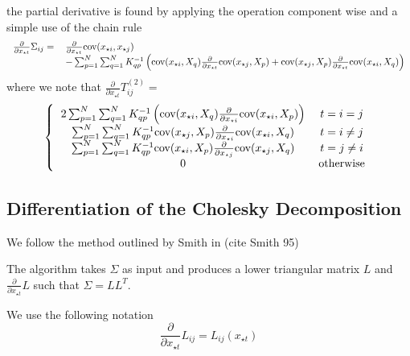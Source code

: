 \documentclass[phd,tocprelim]{cornell}
\begin{document}
the partial derivative is found by applying the operation component wise and a simple use of the chain rule
\begin{equation}
 \begin{tabular}{rl}
 $\frac{\partial}{\partial x_{\star t}} \Sigma_{ij} =$ & $\frac{\partial}{\partial x_{\star t}} \mbox{cov}(x_{\star i}, x_{\star j})$ \\
 & $- \sum_{p = 1}^{N} \sum_{q = 1}^{N} K^{-1}_{qp} \left( \mbox{cov}(x_{\star i}, X_{q}) \frac{\partial}{\partial x_{\star t}} \mbox{cov}(x_{\star j}, X_{p}) + \mbox{cov}(x_{\star j}, X_{p}) \frac{\partial}{\partial x_{\star t}} \mbox{cov}(x_{\star i}, X_{q}) \right)$
 \end{tabular}
\end{equation}
where we note that $\frac{\partial}{\partial x_{\star t}} T^{(2)}_{ij} = $
\begin{equation}
    \left\{ \begin{tabular}{cc}
        $2 \sum_{p = 1}^{N} \sum_{q = 1}^{N} K^{-1}_{qp} \left( \mbox{cov}(x_{\star i}, X_{q}) \frac{\partial}{\partial x_{\star i}} \mbox{cov}(x_{\star i}, X_{p}) \right)$ & $t = i = j$ \\
        $\sum_{p = 1}^{N} \sum_{q = 1}^{N} K^{-1}_{qp} \mbox{cov}(x_{\star j}, X_{p}) \frac{\partial}{\partial x_{\star i}} \mbox{cov}(x_{\star i}, X_{q})$ & $t = i \neq j$ \\
							$\sum_{p = 1}^{N} \sum_{q = 1}^{N} K^{-1}_{qp} \mbox{cov}(x_{\star i}, X_{p}) \frac{\partial}{\partial x_{\star j}} \mbox{cov}(x_{\star j}, X_{q})$ & $t = j \neq i$ \\
							$0$ & otherwise
                                                      \end{tabular} \right.
\end{equation}

\subsection{Differentiation of the Cholesky Decomposition}

We follow the method outlined by Smith in (cite Smith 95)

The algorithm takes $\Sigma$ as input and produces a lower triangular matrix $L$ and $\frac{\partial}{\partial x_{\star t}} L$ such that $\Sigma = LL^{T}$.

We use the following notation
\begin{equation}
    \frac{\partial}{\partial x_{\star t}} L_{ij} = L_{ij} (x_{\star t})
\end{equation}
\end{document}
